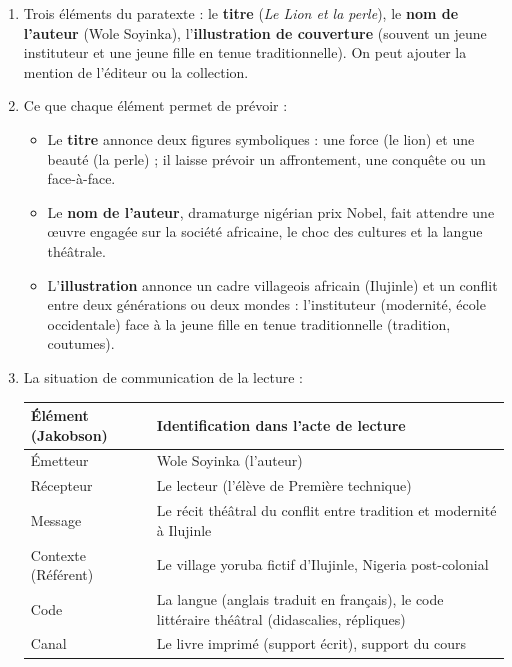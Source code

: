 \documentclass[11pt]{article}
\newcommand{\cle}[1]{{\popxbold\color{popdark}#1}}
\begin{document}
\begin{corrige}
\begin{enumerate}
\item Trois éléments du \cle{paratexte} : le \textbf{titre} (\emph{Le Lion et la perle}), le \textbf{nom de l'auteur} (Wole Soyinka), l'\textbf{illustration de couverture} (souvent un jeune instituteur et une jeune fille en tenue traditionnelle). On peut ajouter la mention de l'éditeur ou la collection.
\item Ce que chaque élément permet de prévoir :
\begin{itemize}
\item Le \textbf{titre} annonce deux figures symboliques : une force (le lion) et une beauté (la perle) ; il laisse prévoir un affrontement, une conquête ou un face-à-face.
\item Le \textbf{nom de l'auteur}, dramaturge nigérian prix Nobel, fait attendre une œuvre engagée sur la société africaine, le choc des cultures et la langue théâtrale.
\item L'\textbf{illustration} annonce un cadre villageois africain (Ilujinle) et un conflit entre deux générations ou deux mondes : l'instituteur (modernité, école occidentale) face à la jeune fille en tenue traditionnelle (tradition, coutumes).
\end{itemize}
\item La situation de communication de la lecture :
\begin{center}
\begin{tabularx}{\linewidth}{|l|X|}\hline
\rowcolor{popblueL} \textbf{Élément (Jakobson)} & \textbf{Identification dans l'acte de lecture} \\ \hline
Émetteur & Wole Soyinka (l'auteur) \\ \hline
Récepteur & Le lecteur (l'élève de Première technique) \\ \hline
Message & Le récit théâtral du conflit entre tradition et modernité à Ilujinle \\ \hline
Contexte (Référent) & Le village yoruba fictif d'Ilujinle, Nigeria post-colonial \\ \hline
Code & La langue (anglais traduit en français), le code littéraire théâtral (didascalies, répliques) \\ \hline
Canal & Le livre imprimé (support écrit), support du cours \\ \hline
\end{tabularx}
\end{center}
\end{enumerate}
\end{corrige}
\end{document}
